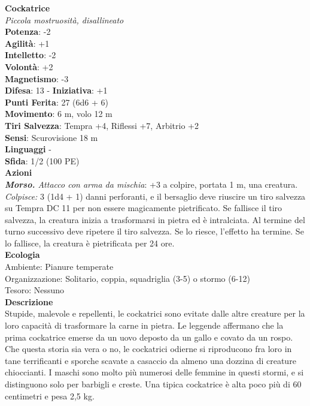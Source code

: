 \begin{multicols}{2}
\medskip\textbf{Cockatrice}\\
\emph{Piccola mostruosità, disallineato}\\
\textbf{Potenza}: -2\\
\textbf{Agilità}: +1\\
\textbf{Intelletto}: -2\\
\textbf{Volontà}: +2\\
\textbf{Magnetismo}: -3\\
\textbf{Difesa}: 13 - \textbf{Iniziativa}: +1\\
\textbf{Punti Ferita}: 27 (6d6 + 6)\\
\textbf{Movimento}: 6 m, volo 12 m\\
\textbf{Tiri Salvezza}: Tempra +4, Riflessi +7, Arbitrio +2\\
\textbf{Sensi}: Scurovisione 18 m\\
\textbf{Linguaggi} -\\
\textbf{Sfida}: 1/2 (100 PE)\smallskip\\
\smallskip\textbf{Azioni}\\
\emph{\textbf{Morso.} Attacco con arma da mischia}: +3 a colpire, portata 1 m, una creatura.\\
\emph{Colpisce:} 3 (1d4 + 1) danni perforanti, e il bersaglio deve riuscire un tiro salvezza su Tempra DC 11 per non essere magicamente pietrificato. Se fallisce il tiro salvezza, la creatura inizia a trasformarsi in pietra ed è intralciata. Al termine del turno successivo deve ripetere il tiro salvezza. Se lo riesce, l'effetto ha termine. Se lo fallisce, la creatura è pietrificata per 24 ore.\\
\textbf{Ecologia}\\
Ambiente: Pianure temperate\\
Organizzazione: Solitario, coppia, squadriglia (3-5) o stormo (6-12)\\
Tesoro: Nessuno\\
\textbf{Descrizione}\\
Stupide, malevole e repellenti, le cockatrici sono evitate dalle altre creature per la loro capacità di trasformare la carne in pietra. Le leggende affermano che la prima cockatrice emerse da un uovo deposto da un gallo e covato da un rospo. Che questa storia sia vera o no, le cockatrici odierne si riproducono fra loro in tane terrificanti e sporche scavate a casaccio da almeno una dozzina di creature chioccianti. I maschi sono molto più numerosi delle femmine in questi stormi, e si distinguono solo per barbigli e creste. Una tipica cockatrice è alta poco più di 60 centimetri e pesa 2,5 kg.\\

\end{multicols}
